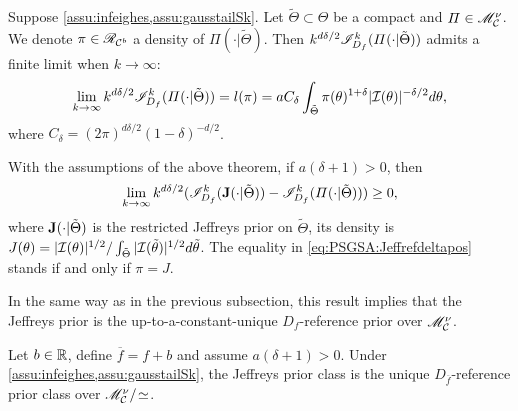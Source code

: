 \begin{thm}\label{thm:refcompact}
    Suppose \cref{assu:infeighes,assu:gausstailSk}.  %
    Let $\tilde\Theta\subset\Theta$ be a compact and  $\varPi\in\mathscr{M}_{\mathcal{C}}^\nu$. We denote $\pi\in\mathscr{R}_{\mathcal{C}^b}$ a density of $\varPi(\cdot|\tilde\Theta)$.
    Then $k^{d\delta/2}\mathscr{I}^k_{D_f}(\varPi(\cdot|\tilde\Theta))$ admits a finite limit when $k\to\infty$:
    \begin{equation}\label{eq:liml}
        \lim_{k\rightarrow\infty} k^{d\delta/2} \mathscr{I}^k_{D_f}(\varPi(\cdot|\tilde\Theta)) = l(\pi) =
a C_\delta \int_{\tilde\Theta}\pi(\theta)^{1+\delta} |\mathcal{I}(\theta)|^{-\delta/2}  d\theta ,
    \end{equation}
where $ C_\delta = (2\pi)^{d\delta/2} (1-\delta)^{-d/2}$.
\end{thm}

\begin{prop}
    With the assumptions of the above theorem,  if $a(\delta+1)>0$, then
        \begin{equation}\label{eq:PSGSA:Jeffrefdeltapos}
            \lim_{k\rightarrow\infty}k^{d\delta/2}(\mathscr{I}^k_{D_f}(\mathbf{J}(\cdot|\tilde\Theta))-\mathscr{I}_{D_f}^k(\varPi(\cdot|\tilde\Theta)))\geq 0 ,
        \end{equation}
    where $\mathbf{J}(\cdot|\tilde\Theta)$ is the restricted Jeffreys prior on $\tilde\Theta$, its density is $J(\theta) = |\mathcal{I}(\theta)|^{1/2}/\int_{\tilde\Theta}|\mathcal{I}(\tilde\theta)|^{1/2}d\tilde\theta$.
    The equality in \cref{eq:PSGSA:Jeffrefdeltapos} stands if and only if 
    {$\pi=J$}.
\end{prop}


In the same way as in the previous subsection, this result implies that the Jeffreys prior is the up-to-a-constant-unique $D_f$-reference prior over $\mathscr{M}^\nu_{\mathcal{C}}$.

\begin{thm}\label{thm:PSGSA:Jrefdeltapos}
    Let $b\in\mathbb{R}$, define $\overline{f}=f+b$ and assume $a(\delta+1)>0$.
    Under \cref{assu:infeighes,assu:gausstailSk}, the Jeffreys prior class is the unique $D_{\overline f}$-reference prior class over $\mathscr{M}^\nu_{\mathcal{C}}/\!\simeq$.
\end{thm}


